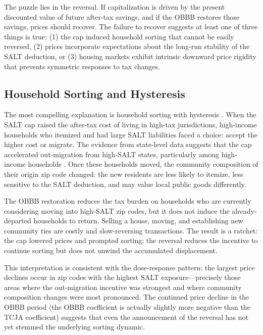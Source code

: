 \documentclass[12pt]{article}
\begin{document}
The puzzle lies in the reversal. If capitalization is driven by the present discounted value of future after-tax savings, and if the OBBB restores those savings, prices should recover. The failure to recover suggests at least one of three things is true: (1) the cap induced household sorting that cannot be easily reversed, (2) prices incorporate expectations about the long-run stability of the SALT deduction, or (3) housing markets exhibit intrinsic downward price rigidity that prevents symmetric responses to tax changes.

\subsection{Household Sorting and Hysteresis}

The most compelling explanation is household sorting with hysteresis \citep{TieboutSamuels1956, Fischel2001}. When the SALT cap raised the after-tax cost of living in high-tax jurisdictions, high-income households who itemized and had large SALT liabilities faced a choice: accept the higher cost or migrate. The evidence from state-level data suggests that the cap accelerated out-migration from high-SALT states, particularly among high-income households \citep{YoungZheng2020, AhmadiKohler2022}. Once these households moved, the community composition of their origin zip code changed: the new residents are less likely to itemize, less sensitive to the SALT deduction, and may value local public goods differently.

The OBBB restoration reduces the tax burden on households who are currently considering moving into high-SALT zip codes, but it does not induce the already-departed households to return. Selling a house, moving, and establishing new community ties are costly and slow-reversing transactions. The result is a ratchet: the cap lowered prices and prompted sorting; the reversal reduces the incentive to continue sorting but does not unwind the accumulated displacement.

This interpretation is consistent with the dose-response pattern: the largest price declines occur in zip codes with the highest SALT exposure---precisely those areas where the out-migration incentive was strongest and where community composition changes were most pronounced. The continued price decline in the OBBB period (the OBBB coefficient is actually slightly more negative than the TCJA coefficient) suggests that even the announcement of the reversal has not yet stemmed the underlying sorting dynamic.
\end{document}
